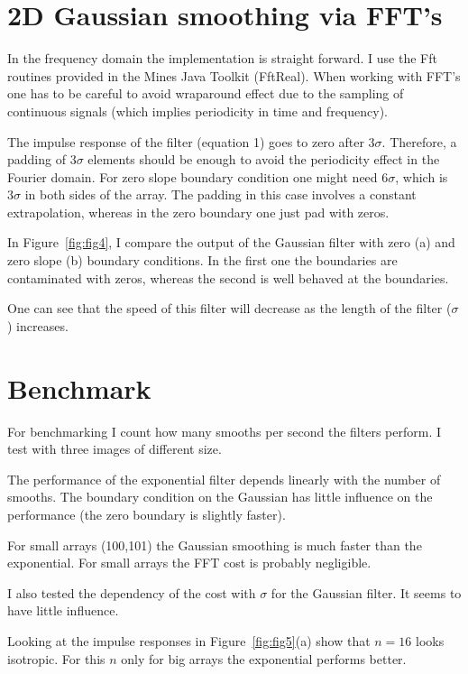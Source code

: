 \documentclass[10pt]{article}
\begin{document}
\section{2D Gaussian smoothing via FFT's}

In the frequency domain the implementation is straight forward. I use the Fft routines
provided in the Mines Java Toolkit (FftReal). When working with FFT's one has to be careful
to avoid wraparound effect due to the sampling of continuous signals (which implies periodicity in 
time and frequency). 

The impulse response of the filter (equation 1) goes to zero after $3\sigma$. Therefore, a padding 
of $3\sigma$ elements should be enough to avoid the periodicity effect in the Fourier domain.
For zero slope boundary condition one might need $6\sigma$, which is $3\sigma$ in both sides of
the array. The padding in this case involves a constant extrapolation, whereas in the zero boundary
one just pad with zeros.


In Figure~\ref{fig:fig4}, I compare the output of the Gaussian filter with zero (a) and zero slope (b)
boundary conditions. In the first one the boundaries are contaminated with zeros,
 whereas the second is well behaved at the boundaries.

One can see that the speed of this filter will decrease as the length of the filter ($\sigma$) increases.

\section{Benchmark}
For benchmarking I count how many smooths per second the filters perform. I test with three images of 
different size.

The performance of the exponential filter depends linearly with the number of smooths. The boundary 
condition on the Gaussian has little influence  on the performance (the zero boundary is slightly
faster).

For small arrays (100,101) the Gaussian smoothing is much faster than the exponential. For 
small arrays the FFT cost is probably negligible.

I also tested the dependency of the cost with $\sigma$ for the Gaussian filter. It seems
to have little influence.

Looking at the impulse responses in Figure~\ref{fig:fig5}(a) show that $n=16$ looks isotropic.
For this $n$ only for big arrays the exponential performs better.
\end{document}
